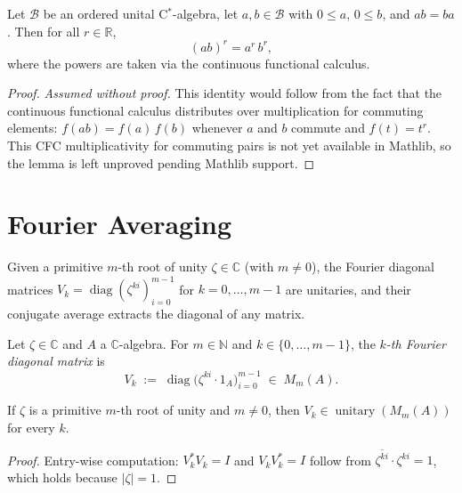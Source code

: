 \begin{lemma}
  \label{lem:mul_rpow_commute}
  \leanok
  Let $\mathcal{B}$ be an ordered unital C$^*$-algebra, let $a, b \in \mathcal{B}$
  with $0 \leq a$, $0 \leq b$, and $ab = ba$.  Then for all $r \in \mathbb{R}$,
  \[
    (ab)^r = a^r\, b^r,
  \]
  where the powers are taken via the continuous functional calculus.
  \begin{proof}
    \emph{Assumed without proof.}  This identity would follow from the fact that the continuous
    functional calculus distributes over multiplication for commuting elements:
    $f(ab) = f(a)\,f(b)$ whenever $a$ and $b$ commute and $f(t) = t^r$.
    This CFC multiplicativity for commuting pairs is not yet available in Mathlib,
    so the lemma is left unproved pending Mathlib support.
  \end{proof}
\end{lemma}

\section{Fourier Averaging}

Given a primitive $m$-th root of unity $\zeta \in \mathbb{C}$ (with $m \neq 0$),
the Fourier diagonal matrices $V_k = \operatorname{diag}(\zeta^{ki})_{i=0}^{m-1}$
for $k = 0, \ldots, m-1$ are unitaries, and their conjugate average extracts the
diagonal of any matrix.

\begin{definition}
  \label{def:fourier_matrix}
  \leanok
  Let $\zeta \in \mathbb{C}$ and $A$ a $\mathbb{C}$-algebra.
  For $m \in \mathbb{N}$ and $k \in \{0,\ldots,m-1\}$, the \emph{$k$-th Fourier
  diagonal matrix} is
  \[
    V_k \;:=\; \operatorname{diag}\!\bigl(\zeta^{k i} \cdot 1_A\bigr)_{i=0}^{m-1}
    \;\in\; M_m(A).
  \]
\end{definition}

\begin{theorem}
  \label{thm:fourier_unitary}
  \leanok
  If $\zeta$ is a primitive $m$-th root of unity and $m \neq 0$, then $V_k \in
  \operatorname{unitary}(M_m(A))$ for every $k$.
  \begin{proof}
    \leanok
    Entry-wise computation: $V_k^* V_k = I$ and $V_k V_k^* = I$ follow from
    $\overline{\zeta^{ki}} \cdot \zeta^{ki} = 1$, which holds because $|\zeta| = 1$.
  \end{proof}
\end{theorem}

